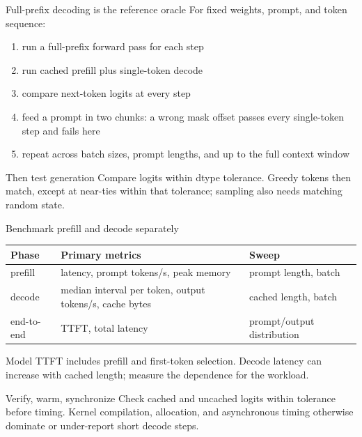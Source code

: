 \documentclass[handout]{beamer}
\begin{document}
\begin{frame}{Full-prefix decoding is the reference oracle}
  For fixed weights, prompt, and token sequence:
  \begin{enumerate}
      \setlength{\itemsep}{5pt}
    \item run a full-prefix forward pass for each step
    \item run cached prefill plus single-token decode
    \item compare next-token logits at every step
    \item feed a prompt in two chunks: a wrong mask offset passes every single-token step and fails here
    \item repeat across batch sizes, prompt lengths, and up to the full context window
  \end{enumerate}
  \begin{block}{Then test generation}
    \small Compare logits within dtype tolerance. Greedy tokens then match, except at near-ties within that tolerance; sampling also needs matching random state.
  \end{block}
\end{frame}

\begin{frame}{Benchmark prefill and decode separately}
  \small
  \begin{tabular}{@{}>{\raggedright\arraybackslash}p{.17\linewidth}>{\raggedright\arraybackslash}p{.43\linewidth}>{\raggedright\arraybackslash}p{.30\linewidth}@{}}
    \toprule
    Phase & Primary metrics & Sweep \\
    \midrule
    prefill & latency, prompt tokens/s, peak memory & prompt length, batch \\
    decode & median interval per token, output tokens/s, cache bytes & cached length, batch \\
    end-to-end & TTFT, total latency & prompt/output distribution \\
    \bottomrule
  \end{tabular}
  \par\vspace{9pt}
  Model TTFT includes prefill and first-token selection. Decode latency can increase with cached length; measure the dependence for the workload.
  \vfill
  \begin{alertblock}{Verify, warm, synchronize}
    Check cached and uncached logits within tolerance before timing. Kernel compilation, allocation, and asynchronous timing otherwise dominate or under-report short decode steps.
  \end{alertblock}
\end{frame}
\end{document}
